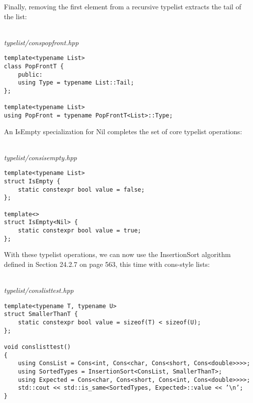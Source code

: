 Finally, removing the first element from a recursive typelist extracts the tail of the list:

\hspace*{\fill} \\ %
\noindent
\textit{typelist/conspopfront.hpp}
\begin{lstlisting}[style=styleCXX]
template<typename List>
class PopFrontT {
	public:
	using Type = typename List::Tail;
};

template<typename List>
using PopFront = typename PopFrontT<List>::Type;
\end{lstlisting}

An IsEmpty specialization for Nil completes the set of core typelist operations:

\hspace*{\fill} \\ %
\noindent
\textit{typelist/consisempty.hpp}
\begin{lstlisting}[style=styleCXX]
template<typename List>
struct IsEmpty {
	static constexpr bool value = false;
};

template<>
struct IsEmpty<Nil> {
	static constexpr bool value = true;
};
\end{lstlisting}

With these typelist operations, we can now use the InsertionSort algorithm defined in Section 24.2.7 on page 563, this time with cons-style lists:

\hspace*{\fill} \\ %
\noindent
\textit{typelist/conslisttest.hpp}
\begin{lstlisting}[style=styleCXX]
template<typename T, typename U>
struct SmallerThanT {
	static constexpr bool value = sizeof(T) < sizeof(U);
};

void conslisttest()
{
	using ConsList = Cons<int, Cons<char, Cons<short, Cons<double>>>>;
	using SortedTypes = InsertionSort<ConsList, SmallerThanT>;
	using Expected = Cons<char, Cons<short, Cons<int, Cons<double>>>>;
	std::cout << std::is_same<SortedTypes, Expected>::value << ’\n’;
}
\end{lstlisting}

